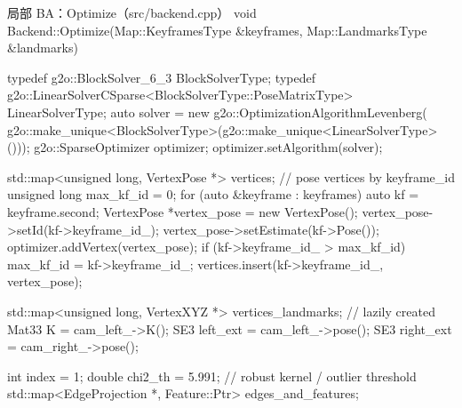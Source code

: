 \begin{codebox}[C++]{局部 BA：Optimize（src/backend.cpp）}
void Backend::Optimize(Map::KeyframesType &keyframes, Map::LandmarksType &landmarks) {
    typedef g2o::BlockSolver_6_3 BlockSolverType;
    typedef g2o::LinearSolverCSparse<BlockSolverType::PoseMatrixType> LinearSolverType;
    auto solver = new g2o::OptimizationAlgorithmLevenberg(
        g2o::make_unique<BlockSolverType>(g2o::make_unique<LinearSolverType>()));
    g2o::SparseOptimizer optimizer;
    optimizer.setAlgorithm(solver);

    std::map<unsigned long, VertexPose *> vertices;       // pose vertices by keyframe_id
    unsigned long max_kf_id = 0;
    for (auto &keyframe : keyframes) {
        auto kf = keyframe.second;
        VertexPose *vertex_pose = new VertexPose();
        vertex_pose->setId(kf->keyframe_id_);
        vertex_pose->setEstimate(kf->Pose());
        optimizer.addVertex(vertex_pose);
        if (kf->keyframe_id_ > max_kf_id) max_kf_id = kf->keyframe_id_;
        vertices.insert({kf->keyframe_id_, vertex_pose});
    }

    std::map<unsigned long, VertexXYZ *> vertices_landmarks;  // lazily created
    Mat33 K = cam_left_->K();
    SE3 left_ext = cam_left_->pose();
    SE3 right_ext = cam_right_->pose();

    int index = 1;
    double chi2_th = 5.991;                        // robust kernel / outlier threshold
    std::map<EdgeProjection *, Feature::Ptr> edges_and_features;

}
\end{codebox}
